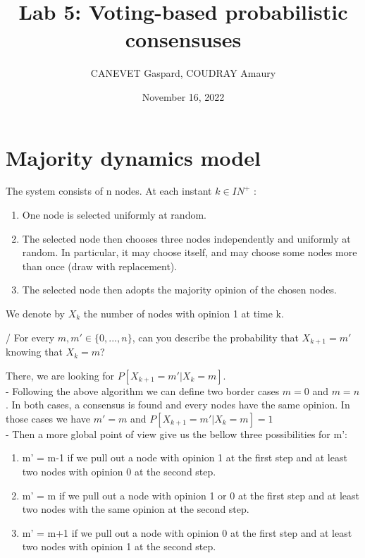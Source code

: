 \documentclass[11pt]{article}
\title{Lab 5: Voting-based probabilistic consensuses}
\author{CANEVET Gaspard, COUDRAY Amaury}
\date{November 16, 2022}
\begin{document}
\maketitle	

\vspace{10mm}



\section{Majority dynamics model}

The system consists of n nodes. At each instant $k \in IN^{+}$ :
\begin{enumerate}
    \item One node is selected uniformly at random.
    \item The selected node then chooses three nodes independently and uniformly at random. In particular, it may choose itself, and may choose some nodes more than once (draw with replacement).
    \item The selected node then adopts the majority opinion of the chosen nodes.
\end{enumerate}

\noindent We denote by $X_{k}$ the number of nodes with opinion 1 at time k.

\vspace{5mm}

/ For every $m, m' \in \{0, . . . , n\}$, can you describe the probability that $X_{k+1} = m'$ knowing that $X_{k} = m$? 

\vspace{5mm}

\noindent There, we are looking for $P[X_{k+1} = m'|X_{k} = m]$. \\
- Following the above algorithm we can define two border cases $m=0$ and $m=n$. In both cases, a consensus is found and every nodes have the same opinion.
In those cases we have $m'=m$ and $P[X_{k+1} = m'|X_{k} = m] = 1$ \\
- Then a more global point of view give us the bellow three possibilities for m': 
\begin{enumerate}[topsep=0pt, itemsep=0pt]
    \item m' = m-1 if we pull out a node with opinion 1 at the first step and at least two nodes with opinion 0 at the second step.
    \item m' = m if we pull out a node with opinion 1 or 0 at the first step and at least two nodes with the same opinion at the second step.
    \item m' = m+1 if we pull out a node with opinion 0 at the first step and at least two nodes with opinion 1 at the second step.
\end{enumerate}
\end{document}
